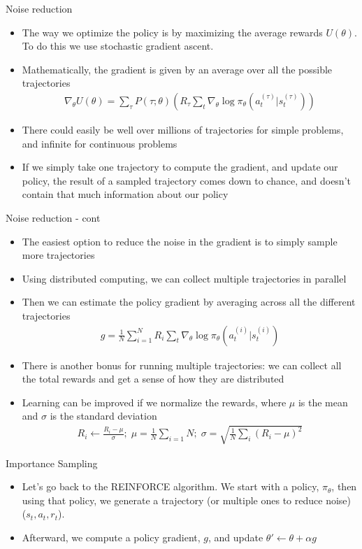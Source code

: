 \documentclass[10pt,mathserif]{beamer}
\begin{document}
\begin{frame}{Noise reduction}
\begin{itemize}
\item The way we optimize the policy is by maximizing the average rewards $U(\theta)$. To do
this we use stochastic gradient ascent.
\item Mathematically, the gradient is given by an average over all the possible trajectories
\begin{align}
\nabla_\theta U(\theta) = \sum_{\tau}P(\tau;\theta)\left(R_{\tau}\sum_{t}\nabla_\theta \log \pi_\theta (a_t^{(\tau)}|s_t^{(\tau)})\right)
\end{align}
\item There could easily be well over millions of trajectories for simple problems, and infinite for continuous problems
\item If we simply take one trajectory to compute the gradient, and update our policy, the
result of a sampled trajectory comes down to chance, and doesn't contain that much information about our policy
\end{itemize}
\end{frame}

\begin{frame}{Noise reduction - cont}
\begin{itemize}
\item The easiest option to reduce the noise in the gradient is to simply sample more
trajectories
\item Using distributed computing, we can collect multiple trajectories in parallel
\item Then we can estimate the policy gradient by averaging across all the different trajectories
\begin{align}
g = \frac{1}{N}\sum_{i=1}^N R_i\sum_t \nabla_\theta \log \pi_\theta(a_t^{(i)}|s_t^{(i)})
\end{align}
\item There is another bonus for running multiple trajectories: we can collect all the total rewards and get a sense of how they are distributed
\item Learning can be improved if we normalize the rewards, where $\mu$ is the mean and $\sigma$ is the standard deviation
\begin{align}
R_i \leftarrow \frac{R_i - \mu}{\sigma}; \; \mu = \frac{1}{N}\sum_{i=1}N; 
\; \sigma = \sqrt{\frac{1}{N}\sum_i(R_i - \mu)^2}
\end{align}
\end{itemize}
\end{frame}


\begin{frame}{Importance Sampling}
\begin{itemize}
\item Let's go back to the REINFORCE algorithm. We start with a policy, $\pi_\theta$, then
using that policy, we generate a trajectory (or multiple ones to reduce noise) 
($s_t, a_t,r_t$).
\item Afterward, we compute a policy gradient, $g$, and update $\theta ' \leftarrow \theta + \alpha g$
\end{itemize}
\end{frame}
\end{document}
